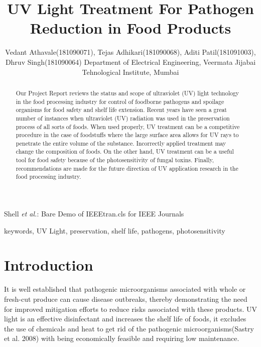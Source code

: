 \documentclass[journal]{IEEEtran}
\begin{document}
\title{\selectfont \centering UV Light Treatment For Pathogen Reduction in Food Products}

\author{\selectfont \centering 
		Vedant Athavale(181090071),
        Tejas Adhikari(181090068),
        Aditi Patil(181091003),
        Dhruv Singh(181090064)
        Department of Electrical Engineering, Veermata Jijabai Tehnological Institute, Mumbai
        }

{Shell \MakeLowercase{\textit{et al.}}: Bare Demo of IEEEtran.cls for IEEE Journals}

\maketitle

\begin{abstract}
Our Project Report reviews the status and scope of ultraviolet (UV) light technology in the food processing industry for control of foodborne pathogens and spoilage organisms for food safety and shelf life extension. Recent years have seen a great number of instances when ultraviolet (UV) radiation was used in the preservation process of all sorts of foods. When used properly, UV treatment can be a competitive procedure in the case of foodstuffs where the large surface area allows for UV rays to penetrate the entire volume of the substance. Incorrectly applied treatment may change the composition of foods. On the other hand, UV treatment can be a useful tool for food safety because of the photosensitivity of fungal toxins. Finally, recommendations are made for the future direction of UV application research in the food processing industry. 
\end{abstract}

\begin{IEEEkeywords}
keywords, UV Light, preservation, shelf life, pathogens, photosensitivity
\end{IEEEkeywords}

\section{Introduction}
 It is well established that pathogenic microorganisms associated with whole or fresh-cut produce can cause disease outbreaks, thereby demonstrating the need for improved mitigation efforts to reduce risks associated with these products. UV light is an effective disinfectant and increases the shelf life of foods, it excludes the use of chemicals and heat to get rid of the pathogenic microorganisms(Sastry et al. 2008) with being economically feasible and requiring low maintenance.
\end{document}
